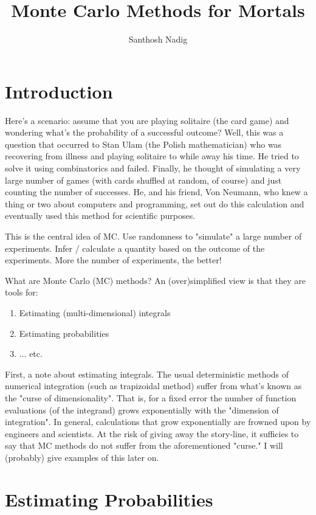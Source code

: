 \documentclass[11pt,onecolumn]{article}
\begin{document}
\title{Monte Carlo Methods for Mortals}
\author{Santhosh Nadig}
\maketitle
\pagebreak
\section{Introduction}
Here's a scenario: assume that you are playing solitaire (the card game) and wondering what's the probability of a successful outcome? Well, this was a question that occurred to Stan Ulam (the Polish mathematician) who was recovering from illness and playing solitaire to while away his time. He tried to solve it using combinatorics and failed. Finally, he thought of simulating a very large number of games (with cards shuffled at random, of course) and just counting the number of successes. He, and his friend, Von Neumann, who knew a thing or two about computers and programming, set out do this calculation and eventually used this method for scientific purposes.

This is the central idea of MC. Use randomness to "simulate" a large number of experiments. Infer / calculate a quantity based on the outcome of the experiments. More the number of experiments, the better!

What are Monte Carlo (MC) methods? An (over)simplified view is that they are tools for:
\begin{enumerate}
 \item Estimating (multi-dimensional) integrals
 \item Estimating probabilities
 \item ... etc.
\end{enumerate}

First, a note about estimating integrals. The usual deterministic methods of numerical integration (such as trapizoidal method) suffer from what's known as the "curse of dimensionality". That is, for a fixed error the number of function evaluations (of the integrand) grows exponentially with the "dimension of integration". In general, calculations that grow exponentially are frowned upon by engineers and scientists. At the risk of giving away the story-line, it sufficies to say that MC methods do not suffer from the aforementioned "curse." I will (probably) give examples of this later on.

\section{Estimating Probabilities} 
\end{document}
